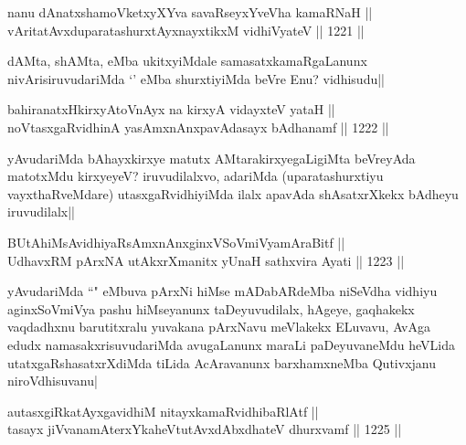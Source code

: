 
\begin{shl}
nanu dAnatxshamoVketxyXYva savaRseyxYveVha kamaRNaH || \\
vAritatAvxduparatashurxtAyx\s nayxtikxM vidhiVyateV ||  1221 ||  
\end{shl}

\begin{artha}
dAMta, shAMta, eMba ukitxyiMdale samasatxkamaRgaLanunx nivArisiruvudariMda `\stext' eMba shurxtiyiMda beVre Enu? vidhisudu||
\end{artha}

\begin{shl}
bahiranatxHkirxyAtoV\s nAyx na kirxyA vidayxteV yataH || \\
noVtasxgaRvidhinA yasAmxnAnxpavAdasayx bAdhanamf ||  1222 ||  
\end{shl}

\begin{artha}
yAvudariMda bAhayxkirxye matutx AMtarakirxyegaLigiMta beVreyAda matotxMdu kirxyeyeV? iruvudilalxvo, adariMda (uparatashurxtiyu vayxthaRveMdare) utasxgaRvidhiyiMda ilalx apavAda shAsatxrXkekx bAdheyu iruvudilalx||
\end{artha}


\begin{shl}
BUtAhiMsAvidhiyaRsAmxnAnxginxVSoVmiVyamAraBitf || \\
UdhavxRM pArxNA utAkxrXmanitx yUnaH sathxvira Ayati ||  1223 ||  
\end{shl}

\begin{artha}
yAvudariMda ``\stext" eMbuva pArxNi hiMse mADabARdeMba niSeVdha vidhiyu aginxSoVmiVya pashu hiMseyanunx taDeyuvudilalx, hAgeye, gaqhakekx vaqdadhxnu barutitxralu yuvakana pArxNavu meVlakekx ELuvavu, AvAga edudx namasakxrisuvudariMda avugaLanunx maraLi paDeyuvaneMdu heVLida utatxgaRshasatxrXdiMda tiLida AcAravanunx barxhamxneMba Qutivxjanu niroVdhisuvanu|
\end{artha}


\begin{shl}
autasxgiRkatAyxgavidhiM nitayxkamaRvidhibaRlAtf || \\
tasayx jiVvanamAterxYkaheVtutAvxdAbxdhateV dhurxvamf ||  1225 ||  
\end{shl}

